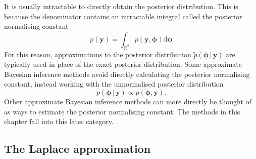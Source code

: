 \documentclass[a4paper, nobind]{templates/ociamthesis}
\begin{document}
It is usually intractable to directly obtain the posterior distribution.
This is because the denominator contains an intractable integral called the posterior normalising constant
\begin{equation}
p(\mathbf{y}) = \int_{\mathbb{R}^d} p(\mathbf{y}, \boldsymbol{\mathbf{\phi}}) \text{d}\boldsymbol{\mathbf{\phi}} \label{eq:evidence}
\end{equation}
For this reason, approximations to the posterior distribution \(\tilde p(\boldsymbol{\mathbf{\phi}} \, | \, \mathbf{y})\) are typically used in place of the exact posterior distribution.
Some approximate Bayesian inference methods avoid directly calculating the posterior normalising constant, instead working with the unnormalised posterior distribution
\begin{equation}
p(\boldsymbol{\mathbf{\phi}} \, | \, \mathbf{y}) \propto p(\boldsymbol{\mathbf{\phi}}, \mathbf{y}).
\end{equation}
Other approximate Bayesian inference methods can more directly be thought of as ways to estimate the posterior normalising constant.
The methods in this chapter fall into this later category.

\hypertarget{the-laplace-approximation}{%
\subsection{The Laplace approximation}\label{the-laplace-approximation}}
\end{document}
